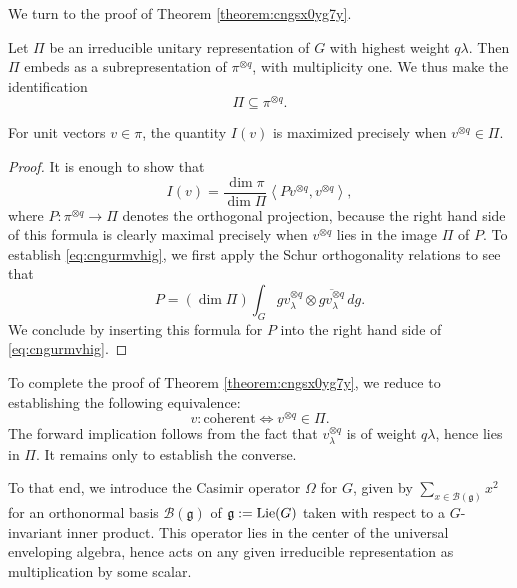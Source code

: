 \documentclass[reqno]{amsart} 
\begin{document}
We turn to the proof of Theorem \ref{theorem:cngsx0yg7y}.

Let $\Pi$ be an irreducible unitary representation of $G$ with highest weight $q \lambda$.  Then $\Pi$ embeds as a subrepresentation of $\pi^{\otimes q}$, with multiplicity one.  We thus make the identification
\begin{equation*}
  \Pi \subseteq  \pi^{\otimes q}. 
\end{equation*}
\begin{lemma}\label{lemma:cngurf0apf}
  For unit vectors $v \in \pi$, the quantity $I(v)$ is maximized precisely when $v^{\otimes q} \in \Pi$.
\end{lemma}
\begin{proof}
  It is enough to show that
  \begin{equation}\label{eq:cngurmvhig}
    I(v) = \frac{\dim \pi}{\dim \Pi}
    \left\langle P v^{\otimes q}, v^{\otimes q} \right\rangle,
  \end{equation}
  where $P : \pi^{\otimes q} \rightarrow \Pi$ denotes the orthogonal projection, because the right hand side of this formula is clearly maximal precisely when $v^{\otimes q}$ lies in the image $\Pi$ of $P$.  To establish \eqref{eq:cngurmvhig}, we first apply the Schur orthogonality relations to see that
  \begin{equation*}
    P =(\dim \Pi) \int_{G} g v_\lambda^{\otimes q}
    \otimes \overline{g v_\lambda^{\otimes q}} \, d g. 
  \end{equation*}
  We conclude by inserting this formula for $P$ into the right hand side of \eqref{eq:cngurmvhig}.
\end{proof}

To complete the proof of Theorem \ref{theorem:cngsx0yg7y}, we reduce to establishing the following equivalence:
\begin{equation}\label{eq:cngsx4hl1k}
  v:\text{coherent} \iff v^{\otimes q} \in \Pi.
\end{equation}
The forward implication follows from the fact that $v_{\lambda}^{\otimes q}$ is of weight $q \lambda$, hence lies in $\Pi$.  It remains only to establish the converse.

To that end, we introduce the Casimir operator $\Omega$ for $G$, given by $\sum_{x \in \mathcal{B}(\mathfrak{g})} x^2$ for an orthonormal basis $\mathcal{B}(\mathfrak{g})$ of $\mathfrak{g} := \operatorname{Lie}(G)$ taken with respect to a $G$-invariant inner product.  This operator lies in the center of the universal enveloping algebra, hence acts on any given irreducible representation as multiplication by some scalar.
\end{document}
